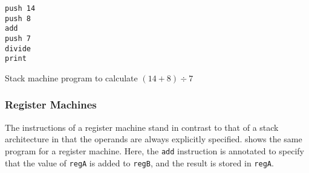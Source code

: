 			\begin{doublefig}
				\begin{halffig}
					\begin{lstlisting}
push 14
push 8
add
push 7
divide
print
					\end{lstlisting}
					\caption{Stack machine program to calculate $(14+8)\div7$}
					\label{fig:stackprogram}
				\end{halffig}
			\end{doublefig}
			
			\subsubsection{Register Machines}
			The instructions of a register machine stand in contrast to that of a stack architecture in that the operands are always explicitly specified.  shows the same program for a register machine. Here, the \texttt{add} instruction is annotated to specify that the value of \texttt{regA} is added to \texttt{regB}, and the result is stored in \texttt{regA}.
			
